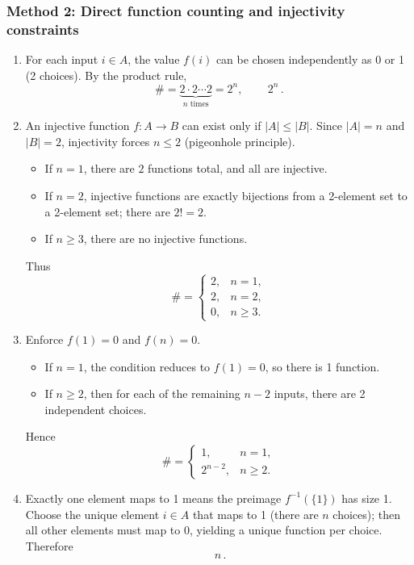 \documentclass[12pt]{article}
\begin{document}
\subsubsection{Method 2: Direct function counting and injectivity constraints}
\begin{enumerate}[label=(\alph*)]
\item For each input $i\in A$, the value $f(i)$ can be chosen independently as 0 or 1 (2 choices). By the product rule,
\[
\# = \underbrace{2\cdot 2\cdots 2}_{n\text{ times}} = 2^n,
\qquad
\boxed{\,2^n\,}.
\]

\item An injective function $f:A\to B$ can exist only if $|A|\le |B|$.
Since $|A|=n$ and $|B|=2$, injectivity forces $n\le 2$ (pigeonhole principle).
\begin{itemize}[leftmargin=*]
\item If $n=1$, there are $2$ functions total, and all are injective.
\item If $n=2$, injective functions are exactly bijections from a 2-element set to a 2-element set; there are $2!=2$.
\item If $n\ge 3$, there are no injective functions.
\end{itemize}
Thus
\[
\boxed{\,
\#=
\begin{cases}
2, & n=1,\\
2, & n=2,\\
0, & n\ge 3.
\end{cases}
\,}
\]

\item Enforce $f(1)=0$ and $f(n)=0$.
\begin{itemize}[leftmargin=*]
\item If $n=1$, the condition reduces to $f(1)=0$, so there is 1 function.
\item If $n\ge 2$, then for each of the remaining $n-2$ inputs, there are 2 independent choices.
\end{itemize}
Hence
\[
\boxed{\,
\#=
\begin{cases}
1, & n=1,\\
2^{n-2}, & n\ge 2.
\end{cases}
\,}
\]

\item Exactly one element maps to 1 means the preimage $f^{-1}(\{1\})$ has size 1.
Choose the unique element $i\in A$ that maps to 1 (there are $n$ choices); then all other elements must map to 0, yielding a unique function per choice. Therefore
\[
\boxed{\,n\,}.
\]
\end{enumerate}
\end{document}
